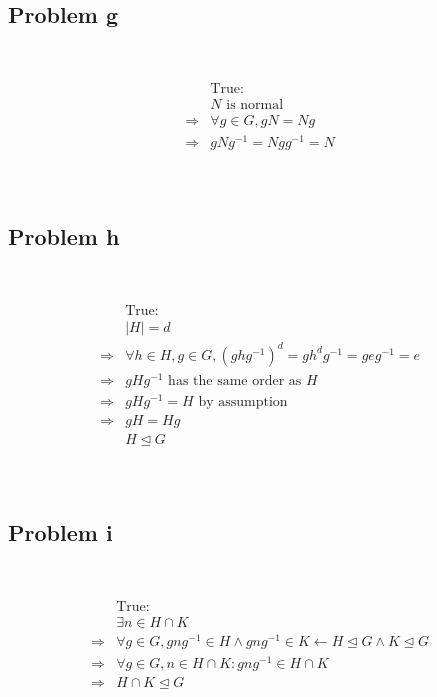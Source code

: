 \documentclass{article}
\begin{document}
~

\subsection*{Problem g}

~

\begin{equation*}
    \begin{split}
        &\text{True}:\\
        &N\text{ is normal}\\
        \Rightarrow&\forall g\in G,gN=Ng\\
        \Rightarrow&gNg^{-1}=Ngg^{-1}=N\\
    \end{split}
\end{equation*}

~

\subsection*{Problem h}

~

\begin{equation*}
    \begin{split}
        &\text{True}:\\
        &|H|=d\\
        \Rightarrow&\forall h\in H,g\in G,(ghg^{-1})^d=gh^dg^{-1}=geg^{-1}=e\\
        \Rightarrow&gHg^{-1}\text{ has the same order as }H\\
        \Rightarrow&gHg^{-1}=H\text{ by assumption}\\
        \Rightarrow&gH=Hg\\
        &H\unlhd G\\
    \end{split}
\end{equation*}

~

\subsection*{Problem i}

~

\begin{equation*}
    \begin{split}
        &\text{True}:\\
        &\exists n\in H\cap K\\
        \Rightarrow&\forall g\in G,gng^{-1}\in H\land gng^{-1}\in K\leftarrow H\unlhd G\land K\unlhd G\\
        \Rightarrow&\forall g\in G,n\in H\cap K:gng^{-1}\in H\cap K\\
        \Rightarrow&H\cap K\unlhd G\\
    \end{split}
\end{equation*}
\end{document}
